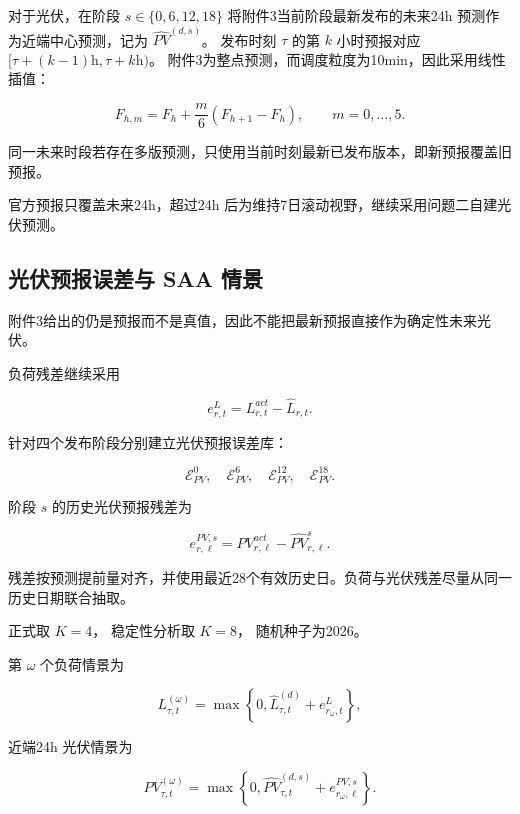 对于光伏，在阶段 \(s\in\{0,6,12,18\}\) 将附件3当前阶段最新发布的未来24h 预测作为近端中心预测，记为 \(\widehat{PV}^{(d,s)}\)。 发布时刻 \(\tau\) 的第 \(k\) 小时预报对应 \([\tau+(k-1)\mathrm{h},\tau+k\mathrm{h})\)。 附件3为整点预测，而调度粒度为10min，因此采用线性插值：

\begin{equation}
F_{h,m}
=
F_h+\frac{m}{6}(F_{h+1}-F_h),
\qquad
m=0,\ldots,5.
\end{equation}

同一未来时段若存在多版预测，只使用当前时刻最新已发布版本，即新预报覆盖旧预报。

官方预报只覆盖未来24h，超过24h 后为维持7日滚动视野，继续采用问题二自建光伏预测。

\subsection{光伏预报误差与 SAA 情景}

附件3给出的仍是预报而不是真值，因此不能把最新预报直接作为确定性未来光伏。

负荷残差继续采用

\[
e^L_{r,t}
=
L^{act}_{r,t}
-
\hat L_{r,t}.
\]

针对四个发布阶段分别建立光伏预报误差库：

\[
\mathcal E_{PV}^{0},
\quad
\mathcal E_{PV}^{6},
\quad
\mathcal E_{PV}^{12},
\quad
\mathcal E_{PV}^{18}.
\]

阶段 \(s\) 的历史光伏预报残差为

\begin{equation}
e^{PV,s}_{r,\ell}
=
PV^{act}_{r,\ell}
-
\widehat{PV}^{s}_{r,\ell}.
\end{equation}

残差按预测提前量对齐，并使用最近28个有效历史日。负荷与光伏残差尽量从同一历史日期联合抽取。

正式取 \(K=4\)， 稳定性分析取 \(K=8\)， 随机种子为2026。

第 \(\omega\) 个负荷情景为

\begin{equation}
L^{(\omega)}_{\tau,t}
=
\max
\left\{
0,
\hat L^{(d)}_{\tau,t}
+
e^L_{r_\omega,t}
\right\},
\end{equation}

近端24h 光伏情景为

\begin{equation}
PV^{(\omega)}_{\tau,t}
=
\max
\left\{
0,
\widehat{PV}^{(d,s)}_{\tau,t}
+
e^{PV,s}_{r_\omega,\ell}
\right\}.
\end{equation}

